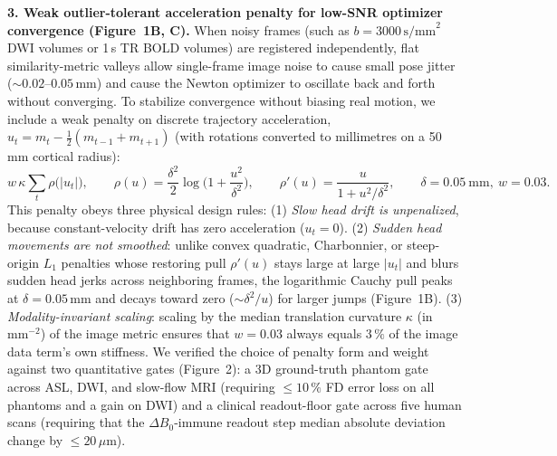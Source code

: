 \documentclass[11pt]{article}
\begin{document}
\textbf{3. Weak outlier-tolerant acceleration penalty for low-SNR optimizer convergence (Figure~1B, C).}
When noisy frames (such as $b = 3000\,\text{s/mm}^2$ DWI volumes or 1\,s TR BOLD volumes) are registered independently, flat similarity-metric valleys allow single-frame image noise to cause small pose jitter ($\sim 0.02\text{--}0.05$\,mm) and cause the Newton optimizer to oscillate back and forth without converging. To stabilize convergence without biasing real motion, we include a weak penalty on discrete trajectory acceleration, $u_t = m_t - \tfrac12(m_{t-1} + m_{t+1})$ (with rotations converted to millimetres on a 50\,mm cortical radius):
\begin{equation}
w\,\kappa \sum_t \rho\big(|u_t|\big), \qquad
\rho(u) = \frac{\delta^2}{2}\log\!\Big(1 + \frac{u^2}{\delta^2}\Big), \qquad
\rho'(u) = \frac{u}{1 + u^2/\delta^2}, \qquad \delta = 0.05\ \text{mm},\ w = 0.03.
\label{eq:prior}
\end{equation}
This penalty obeys three physical design rules: (1) \emph{Slow head drift is unpenalized}, because constant-velocity drift has zero acceleration ($u_t = 0$). (2) \emph{Sudden head movements are not smoothed}: unlike convex quadratic, Charbonnier, or steep-origin $L_1$ penalties whose restoring pull $\rho'(u)$ stays large at large $|u_t|$ and blurs sudden head jerks across neighboring frames, the logarithmic Cauchy pull peaks at $\delta = 0.05$\,mm and decays toward zero ($\sim \delta^2/u$) for larger jumps (Figure~1B). (3) \emph{Modality-invariant scaling}: scaling by the median translation curvature $\kappa$ (in $\text{mm}^{-2}$) of the image metric ensures that $w = 0.03$ always equals $3\,\%$ of the image data term's own stiffness. We verified the choice of penalty form and weight against two quantitative gates (Figure~2): a 3D ground-truth phantom gate across ASL, DWI, and slow-flow MRI (requiring $\le 10\,\%$ FD error loss on all phantoms and a gain on DWI) and a clinical readout-floor gate across five human scans (requiring that the $\Delta B_0$-immune readout step median absolute deviation change by $\le 20\,\mu\text{m}$).
\end{document}
